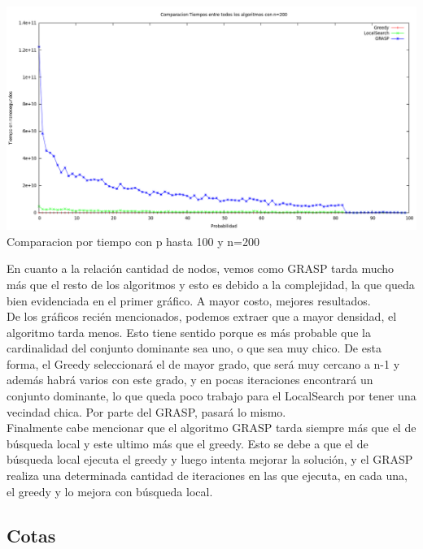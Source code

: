 \begin{center}
\includegraphics[width=17cm]{./graficos/comparaciontiemposprobvariablen200.png}\\
Comparacion por tiempo con p hasta 100 y n=200
\end{center}

En cuanto a la relación cantidad de nodos, vemos como GRASP tarda mucho más que el resto de los algoritmos 
y esto es debido a la complejidad, la que queda bien evidenciada en el primer gráfico. A mayor costo, mejores resultados.\\
De los gráficos recién mencionados, podemos extraer que a mayor densidad, el algoritmo tarda menos.
Esto tiene sentido porque es más probable que la cardinalidad del conjunto dominante sea uno, o que sea muy chico.
De esta forma, el Greedy seleccionará el de mayor grado, que será muy cercano a n-1 y además habrá varios con este grado, y en pocas iteraciones
encontrará un conjunto dominante, lo que queda poco trabajo para el LocalSearch por tener una vecindad chica.
Por parte del GRASP, pasará lo mismo.\\
Finalmente cabe mencionar que el algoritmo GRASP tarda siempre más que el de búsqueda local y este ultimo más que el
greedy. Esto se debe a que el de búsqueda local ejecuta el greedy y luego intenta mejorar la solución, y el GRASP realiza una
determinada cantidad de iteraciones en las que ejecuta, en cada una, el greedy y lo mejora con búsqueda local.

\subsection{Cotas}

